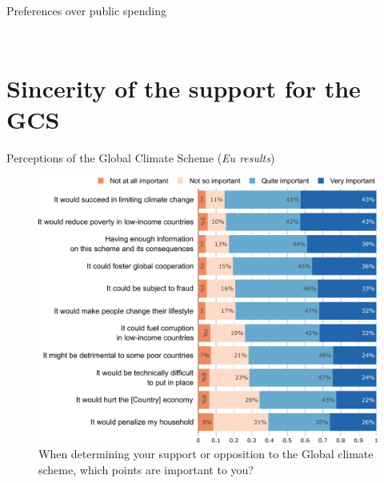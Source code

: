\begin{framefont}{\small}
\begin{frame}{Preferences over public spending%
	\label{}}
\begin{columns}
\begin{column}{0.5\textwidth}
\begin{figure}
            \end{figure}
        \end{column}
    \end{columns}
	\bbvs \ip {}
	\ee 
\end{frame}

\section{Sincerity of the support for the GCS}

\begin{frame}{Perceptions of the Global Climate Scheme (\textit{Eu results})\label{}}
	\vspace{-.3cm}
    \begin{figure}
        \centering 
        \caption{When determining your support or opposition to the Global climate scheme, which points are important to you?}
        \vspace{-.2cm}
        \includegraphics[height=.9\textheight]{../figures/EU/gcs_important.pdf} 
    \end{figure}
\end{frame}


\end{framefont}
